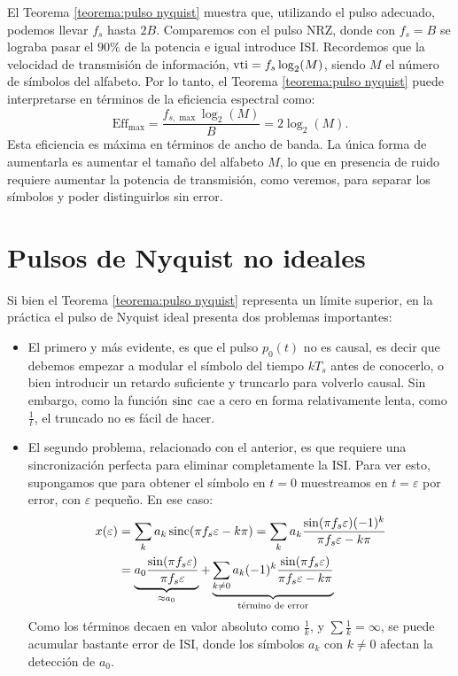 El Teorema \ref{teorema:pulso nyquist} muestra que, utilizando el pulso adecuado, podemos llevar $f_s$ hasta $2B$. Comparemos con el pulso NRZ, donde con $f_s=B$ se lograba pasar el $90\%$ de la potencia e igual introduce ISI. Recordemos que la velocidad de transmisión de información, $\mathrm{vti} = f_s \log_2(M)$, siendo $M$ el número de símbolos del alfabeto. Por lo tanto, el Teorema \ref{teorema:pulso nyquist} puede interpretarse en términos de la eficiencia espectral como:
\begin{equation*}
\mathrm{Eff}_{\max} = \frac{f_{s,\max}\log_2(M)}{B} = 2\log_2(M).
\end{equation*}
Esta eficiencia es máxima en términos de ancho de banda. La única forma de aumentarla es aumentar el tamaño del alfabeto $M$, lo que en presencia de ruido requiere aumentar la potencia de transmisión, como veremos, para separar los símbolos y poder distinguirlos sin error.

\section{Pulsos de Nyquist no ideales}\label{sec:nyquist no ideal}

Si bien el Teorema \ref{teorema:pulso nyquist} representa un límite superior, en la práctica el pulso de Nyquist ideal presenta dos problemas importantes:
\begin{itemize}
    \item El primero y más evidente, es que el pulso $p_0(t)$ no es causal, es decir que debemos empezar a modular el símbolo del tiempo $kT_s$ antes de conocerlo, o bien introducir un retardo suficiente y truncarlo para volverlo causal. Sin embargo, como la función $\operatorname{sinc}$ cae a cero en forma relativamente lenta, como $\frac{1}{t}$, el truncado no es fácil de hacer.
    \item El segundo problema, relacionado con el anterior, es que requiere una sincronización perfecta para eliminar completamente la ISI. Para ver esto, supongamos que para obtener el símbolo en $t=0$ muestreamos en $t=\varepsilon$ por error, con $\varepsilon$ pequeño. En ese caso:
    \begin{align*}
        x(\varepsilon)  & = \sum_k a_k \operatorname{sinc} (\pi f_s \varepsilon - k\pi) = \sum_k a_k \frac{\sin(\pi f_s \varepsilon) (-1)^k}{\pi f_s\varepsilon -k\pi}\\
                & = \underbrace{a_0 \frac{\sin(\pi f_s \varepsilon)}{\pi f_s \varepsilon}}_{\approx a_0} + \underbrace{\sum_{k\neq 0} a_k (-1)^k \frac{\sin(\pi f_s \varepsilon)}{\pi f_s \varepsilon - k \pi}}_{\text{término de error}}
    \end{align*}
    Como los términos decaen en valor absoluto como $\frac{1}{k}$, y $\sum \frac{1}{k}=\infty$, se puede acumular bastante error de ISI, donde los símbolos $a_k$ con $k\neq 0$ afectan la detección de $a_0$.
\end{itemize}

